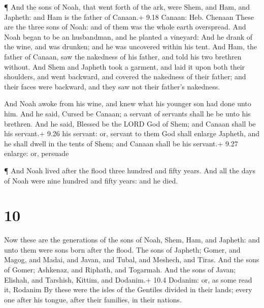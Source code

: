  ¶ And the sons of Noah, that went forth of the ark, were
Shem, and Ham, and Japheth: and Ham is the father of Canaan.+ 9.18
Canaan: Heb. Chenaan  These are the three sons of Noah: and
of them was the whole earth overspread.  And Noah began to
be an husbandman, and he planted a vineyard:  And he drank
of the wine, and was drunken; and he was uncovered within his tent.
 And Ham, the father of Canaan, saw the nakedness of his
father, and told his two brethren without.  And Shem and
Japheth took a garment, and laid it upon both their shoulders, and went
backward, and covered the nakedness of their father; and their faces
were backward, and they saw not their father's nakedness.

 And Noah awoke from his wine, and knew what his younger
son had done unto him.  And he said, Cursed be Canaan; a
servant of servants shall he be unto his brethren.  And he
said, Blessed be the LORD God of Shem; and Canaan shall be his servant.+
9.26 his servant: or, servant to them  God shall enlarge
Japheth, and he shall dwell in the tents of Shem; and Canaan shall be
his servant.+ 9.27 enlarge: or, persuade

 ¶ And Noah lived after the flood three hundred and fifty
years.  And all the days of Noah were nine hundred and
fifty years: and he died.

\hypertarget{section-9}{%
\section{10}\label{section-9}}

 Now these are the generations of the sons of Noah, Shem,
Ham, and Japheth: and unto them were sons born after the flood.
 The sons of Japheth; Gomer, and Magog, and Madai, and
Javan, and Tubal, and Meshech, and Tiras.  And the sons of
Gomer; Ashkenaz, and Riphath, and Togarmah.  And the sons of
Javan; Elishah, and Tarshish, Kittim, and Dodanim.+ 10.4 Dodanim: or, as
some read it, Rodanim  By these were the isles of the
Gentiles divided in their lands; every one after his tongue, after their
families, in their nations.

